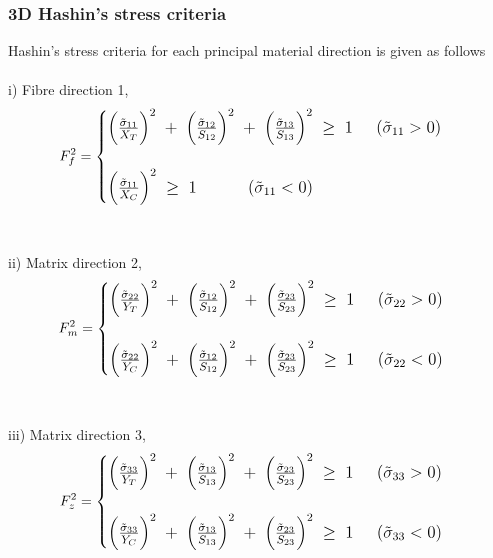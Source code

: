 \documentclass[a4paper,12pt]{extarticle}
\begin{document}
\subsubsection{3D Hashin's stress criteria}
\indent\indent\indent Hashin's stress criteria for each principal material direction is given as follows
\\
\\
i) Fibre direction 1,
\\
\begin{equation}
\large{F_{f}^{2} =  
	\begin{cases}
	\Big(\frac{\tilde{\sigma}_{11}}{X_{T}}\Big)^{2} \; + \; \Big(\frac{\tilde{\sigma}_{12}}{S_{12}}\Big)^{2} \; + \; \Big(\frac{\tilde{\sigma}_{13}}{S_{13}}\Big)^{2} \; \geq  \; 1  \; \; \; \; \;  (\tilde{\sigma}_{11}  >  0)  \\
	\\
	\Big(\frac{\tilde{\sigma}_{11}}{X_{C}}\Big)^{2}  \; \geq  \; 1 \; \; \; \; \; \; \;  \; \; \; \;  (\tilde{\sigma}_{11}  <  0) 
	
	\end{cases}}
\end{equation}
\\
\\
ii) Matrix direction 2,
\\
\begin{equation}
\large{F_{m}^{2} =  
	\begin{cases} 
		\Big(\frac{\tilde{\sigma}_{22}}{Y_{T}}\Big)^{2} \; + \; \Big(\frac{\tilde{\sigma}_{12}}{S_{12}}\Big)^{2} \; + \; \Big(\frac{\tilde{\sigma}_{23}}{S_{23}}\Big)^{2} \; \geq  \; 1  \; \; \; \; \;  (\tilde{\sigma}_{22}  >  0)  \\
		\\
		\Big(\frac{\tilde{\sigma}_{22}}{Y_{C}}\Big)^{2} \; + \; \Big(\frac{\tilde{\sigma}_{12}}{S_{12}}\Big)^{2} \; + \; \Big(\frac{\tilde{\sigma}_{23}}{S_{23}}\Big)^{2} \; \geq  \; 1  \; \; \; \; \;  (\tilde{\sigma}_{22}  <  0)  \\		
	\end{cases}}
\end{equation}
\\
\\
iii) Matrix direction 3,
\\
\begin{equation}
\large{F_{z}^{2} =  
	\begin{cases} 
		\Big(\frac{\tilde{\sigma}_{33}}{Y_{T}}\Big)^{2} \; + \; \Big(\frac{\tilde{\sigma}_{13}}{S_{13}}\Big)^{2} \; + \; \Big(\frac{\tilde{\sigma}_{23}}{S_{23}}\Big)^{2} \; \geq  \; 1  \; \; \; \; \;  (\tilde{\sigma}_{33}  >  0)  \\
		\\
		\Big(\frac{\tilde{\sigma}_{33}}{Y_{C}}\Big)^{2} \; + \; \Big(\frac{\tilde{\sigma}_{13}}{S_{13}}\Big)^{2} \; + \; \Big(\frac{\tilde{\sigma}_{23}}{S_{23}}\Big)^{2} \; \geq  \; 1  \; \; \; \; \;  (\tilde{\sigma}_{33}  <  0)  \\		
	\end{cases}}
\end{equation}
\end{document}
